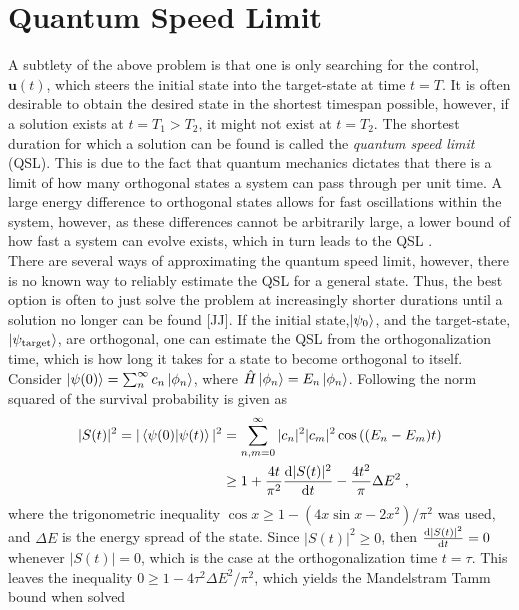 \section{Quantum Speed Limit}
A subtlety of the above problem is that one is only searching for the control, $\boldsymbol{u}(t)$, which steers the initial state into the target-state at time $t = T$. It is often desirable to obtain the desired state in the shortest timespan possible, however, if a solution exists at $t= T_1 > T_2$, it might not exist at $t = T_2$. The shortest duration for which a solution can be found is called the \textit{quantum speed limit} (QSL). This is due to the fact that quantum mechanics dictates that there is a limit of how many orthogonal states a system can pass through per unit time. A large energy difference to orthogonal states allows for fast oscillations within the system, however, as these differences cannot be arbitrarily large, a lower bound of how fast a system can evolve exists, which in turn leads to the QSL \cite{Caneva2009}.\\
There are several ways of approximating the quantum speed limit, however, there is no known way to reliably estimate the QSL for a general state. Thus, the best option is often to just solve the problem at increasingly shorter durations until a solution no longer can be found [JJ]. 
If the initial state,$\ket{\psi_0}$, and the target-state, $\ket{\psi_{\mathrm{target}}}$, are orthogonal, one can estimate the QSL from the orthogonalization time, which is how long it takes for a state to become orthogonal to itself.
Consider $\ket{\psi (0)} = \sum_{n}^{\infty} c_n \ket{\phi _n}$, where $\hat{H} \ket{\phi _n} = E_n \ket{\phi _n}$. Following \cite{QSLtoffoli} the norm squared of the survival probability is given as
\begin{align}
	|S(t)|^2 = |\braket{\psi (0) | \psi (t)}|^2 &= \sum_{n , m = 0}^{\infty} |c_n|^2 |c_m|^2 \cos \left( (E_n - E_m) t \right) \nonumber \\
	&\geq 1 + \frac{4 t}{\pi ^2} \dv{|S(t)|^2}{t} - \frac{4 t^2}{\pi} \Delta E^2 \; ,
\end{align}
where the trigonometric inequality $\cos x \geq 1 - \left( 4 x \sin x - 2 x^2 \right) / \pi^2$ was used, and $\Delta E$ is the energy spread of the state.
Since $|S(t)|^2 \geq 0$, then $\dv{|S(t)|^2}{t} = 0$ whenever $|S(t)| = 0$, which is the case at the orthogonalization time $t = \tau$. This leaves the inequality $0 \geq 1 - 4 \tau^2 \Delta E^2 / \pi^2$, which yields the Mandelstram Tamm bound when solved \cite{Mandelstam1991}
